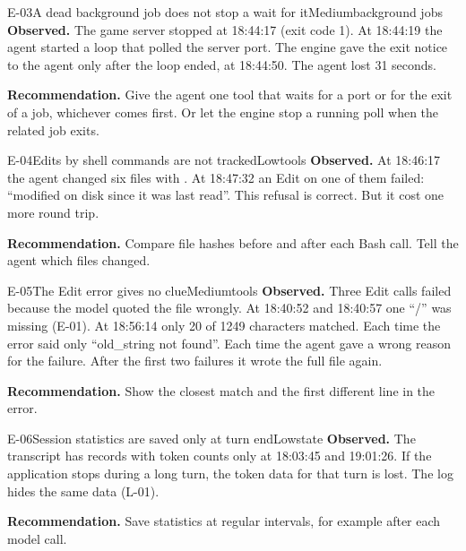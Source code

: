 \documentclass[11pt,a4paper]{article}
\newcommand{\code}[1]{\texttt{\detokenize{#1}}}
\begin{document}
\begin{findingbox}{E-03}{A dead background job does not stop a wait for it}{Medium}{background jobs}
\textbf{Observed.} The game server stopped at 18:44:17 (exit code 1). At
18:44:19 the agent started a loop that polled the server port. The engine gave
the exit notice to the agent only after the loop ended, at 18:44:50. The agent
lost 31 seconds.

\textbf{Recommendation.} Give the agent one tool that waits for a port or for the
exit of a job, whichever comes first. Or let the engine stop a running poll when
the related job exits.
\end{findingbox}

\begin{findingbox}{E-04}{Edits by shell commands are not tracked}{Low}{tools}
\textbf{Observed.} At 18:46:17 the agent changed six files with \code{sed -i}.
At 18:47:32 an Edit on one of them failed: ``modified on disk since it was last
read''. This refusal is correct. But it cost one more round trip.

\textbf{Recommendation.} Compare file hashes before and after each Bash call.
Tell the agent which files changed.
\end{findingbox}

\begin{findingbox}{E-05}{The Edit error gives no clue}{Medium}{tools}
\textbf{Observed.} Three Edit calls failed because the model quoted the file
wrongly. At 18:40:52 and 18:40:57 one ``/'' was missing (E-01). At 18:56:14 only
20 of 1249 characters matched. Each time the error said only ``old\_string not
found''. Each time the agent gave a wrong reason for the failure. After the
first two failures it wrote the full file again.

\textbf{Recommendation.} Show the closest match and the first different line in
the error.
\end{findingbox}

\begin{findingbox}{E-06}{Session statistics are saved only at turn end}{Low}{state}
\textbf{Observed.} The transcript has \code{meta} records with token counts only
at 18:03:45 and 19:01:26. If the application stops during a long turn, the token
data for that turn is lost. The log hides the same data (L-01).

\textbf{Recommendation.} Save statistics at regular intervals, for example after
each model call.
\end{findingbox}

\end{document}
